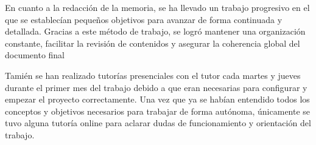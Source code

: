 En cuanto a la redacción de la memoria, se ha llevado un trabajo progresivo en el que se establecían pequeños objetivos para avanzar de forma continuada y detallada. Gracias a este método de trabajo, se logró mantener una organización constante, facilitar la revisión de contenidos y asegurar la coherencia global del documento final

Tamién se han realizado tutorías presenciales con el tutor cada martes y jueves durante el primer mes del trabajo debido a que eran necesarias para configurar y empezar el proyecto correctamente. Una vez que ya se habían entendido todos los conceptos y objetivos necesarios para trabajar de forma autónoma, únicamente se tuvo alguna tutoría online para aclarar dudas de funcionamiento y orientación del trabajo.

